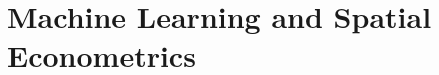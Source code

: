 \documentclass[12pt, a4paper, twoside, openright]{book}
\begin{document}
\part{Machine Learning and Spatial Econometrics}
















\backmatter




\printindex
\end{document}
